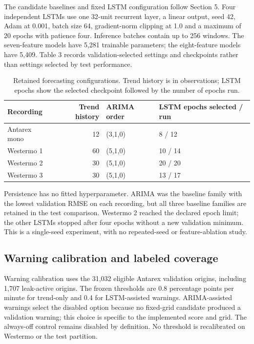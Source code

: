 \documentclass[10pt,a4paper,twocolumn]{article}
\begin{document}
The candidate baselines and fixed LSTM configuration follow Section 5. Four independent LSTMs use one 32-unit recurrent layer, a linear output, seed 42, Adam at 0.001, batch size 64, gradient-norm clipping at 1.0 and a maximum of 20 epochs with patience four. Inference batches contain up to 256 windows. The seven-feature models have 5,281 trainable parameters; the eight-feature models have 5,409. Table 3 records validation-selected settings and checkpoints rather than settings selected by test performance.

\begin{table}[tbp]
\centering
\caption{Retained forecasting configurations. Trend history is in observations; LSTM epochs show the selected checkpoint followed by the number of epochs run.}
\label{tab:3}
\fontsize{8.5}{10.2}\selectfont
\setlength{\tabcolsep}{2.4pt}
\renewcommand{\arraystretch}{1.17}
\begin{tabularx}{\linewidth}{@{}L{1.08}R{0.65}L{0.85}L{1.42}@{}}
\toprule
\textbf{Recording} & \textbf{Trend history} & \textbf{ARIMA order} & \textbf{LSTM epochs selected / run} \\
\midrule
Antarex mono & 12 & (3,1,0) & 8 / 12 \\
Westermo 1 & 60 & (5,1,0) & 10 / 14 \\
Westermo 2 & 30 & (5,1,0) & 20 / 20 \\
Westermo 3 & 30 & (5,1,0) & 13 / 17 \\
\bottomrule
\end{tabularx}
\end{table}

Persistence has no fitted hyperparameter. ARIMA was the baseline family with the lowest validation RMSE on each recording, but all three baseline families are retained in the test comparison. Westermo 2 reached the declared epoch limit; the other LSTMs stopped after four epochs without a new validation minimum. This is a single-seed experiment, with no repeated-seed or feature-ablation study.

\subsection{Warning calibration and labeled coverage}

Warning calibration uses the 31,032 eligible Antarex validation origins, including 1,707 leak-active origins. The frozen thresholds are 0.8 percentage points per minute for trend-only and 0.4 for LSTM-assisted warnings. ARIMA-assisted warnings select the disabled option because no fixed-grid candidate produced a validation warning; this choice is specific to the implemented score and grid. The always-off control remains disabled by definition. No threshold is recalibrated on Westermo or the test partition.
\end{document}
